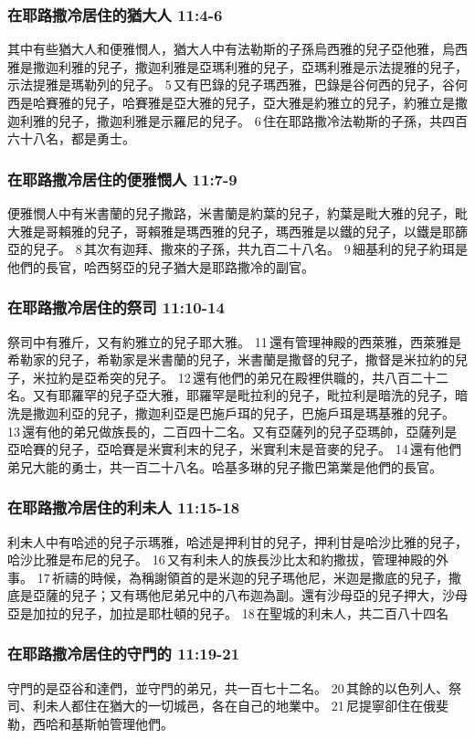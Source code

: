 \subsubsection{在耶路撒冷居住的猶大人 11:4-6}
其中有些猶大人和便雅憫人，猶大人中有法勒斯的子孫烏西雅的兒子亞他雅，烏西雅是撒迦利雅的兒子，撒迦利雅是亞瑪利雅的兒子，亞瑪利雅是示法提雅的兒子，示法提雅是瑪勒列的兒子。 5 又有巴錄的兒子瑪西雅，巴錄是谷何西的兒子，谷何西是哈賽雅的兒子，哈賽雅是亞大雅的兒子，亞大雅是約雅立的兒子，約雅立是撒迦利雅的兒子，撒迦利雅是示羅尼的兒子。 6 住在耶路撒冷法勒斯的子孫，共四百六十八名，都是勇士。

\subsubsection{在耶路撒冷居住的便雅憫人 11:7-9}
便雅憫人中有米書蘭的兒子撒路，米書蘭是約葉的兒子，約葉是毗大雅的兒子，毗大雅是哥賴雅的兒子，哥賴雅是瑪西雅的兒子，瑪西雅是以鐵的兒子，以鐵是耶篩亞的兒子。 8 其次有迦拜、撒來的子孫，共九百二十八名。 9 細基利的兒子約珥是他們的長官，哈西努亞的兒子猶大是耶路撒冷的副官。

\subsubsection{在耶路撒冷居住的祭司 11:10-14}
祭司中有雅斤，又有約雅立的兒子耶大雅。 11 還有管理神殿的西萊雅，西萊雅是希勒家的兒子，希勒家是米書蘭的兒子，米書蘭是撒督的兒子，撒督是米拉約的兒子，米拉約是亞希突的兒子。 12 還有他們的弟兄在殿裡供職的，共八百二十二名。又有耶羅罕的兒子亞大雅，耶羅罕是毗拉利的兒子，毗拉利是暗洗的兒子，暗洗是撒迦利亞的兒子，撒迦利亞是巴施戶珥的兒子，巴施戶珥是瑪基雅的兒子。 13 還有他的弟兄做族長的，二百四十二名。又有亞薩列的兒子亞瑪帥，亞薩列是亞哈賽的兒子，亞哈賽是米實利末的兒子，米實利末是音麥的兒子。 14 還有他們弟兄大能的勇士，共一百二十八名。哈基多琳的兒子撒巴第業是他們的長官。

\subsubsection{在耶路撒冷居住的利未人 11:15-18}
利未人中有哈述的兒子示瑪雅，哈述是押利甘的兒子，押利甘是哈沙比雅的兒子，哈沙比雅是布尼的兒子。 16 又有利未人的族長沙比太和約撒拔，管理神殿的外事。 17 祈禱的時候，為稱謝領首的是米迦的兒子瑪他尼，米迦是撒底的兒子，撒底是亞薩的兒子；又有瑪他尼弟兄中的八布迦為副。還有沙母亞的兒子押大，沙母亞是加拉的兒子，加拉是耶杜頓的兒子。 18 在聖城的利未人，共二百八十四名

\subsubsection{在耶路撒冷居住的守門的 11:19-21}
守門的是亞谷和達們，並守門的弟兄，共一百七十二名。 20 其餘的以色列人、祭司、利未人都住在猶大的一切城邑，各在自己的地業中。 21 尼提寧卻住在俄斐勒，西哈和基斯帕管理他們。

